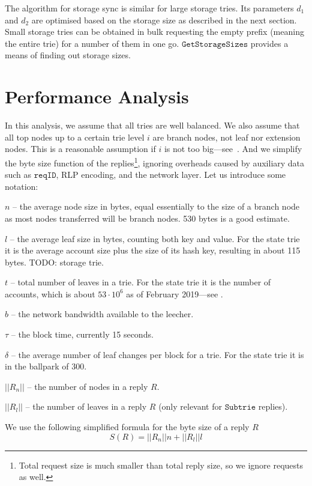 \documentclass{amsart}
\begin{document}
The algorithm for storage sync is similar for large storage tries.
Its parameters $d_1$ and $d_2$ are optimised based on the storage size as described in the next section.
Small storage tries can be obtained in bulk requesting the empty prefix (meaning the entire trie) for a number of them in one go.
$\texttt{GetStorageSizes}$ provides a means of finding out storage sizes.

\section{Performance Analysis}

In this analysis, we assume that all tries are well balanced.
We also assume that all top nodes up to a certain trie level $i$ are branch nodes, not leaf nor extension nodes.
This is a reasonable assumption if $i$ is not too big---see~\cite{akhunov_1x_workshop_part2}.
And we simplify the byte size function of the replies\footnote{Total
request size is much smaller than total reply size, so we ignore requests as well.},
ignoring overheads caused by auxiliary data such as $\texttt{reqID}$,
RLP encoding, and the network layer.
Let us introduce some notation:

$n$ -- the average node size in bytes,
equal essentially to the size of a branch node as most nodes transferred will be branch nodes.
530 bytes is a good estimate.

$l$ -- the average leaf size in bytes, counting both key and value.
For the state trie it is the average account size plus the size of its hash key,
resulting in about 115 bytes.
TODO: storage trie.

$t$ -- total number of leaves in a trie.
For the state trie it is the number of accounts,
which is about $53 \cdot 10^6$ as of February 2019---see \cite{akhunov_1x_workshop_part2}.

$b$ -- the network bandwidth available to the leecher.

$\tau$ -- the block time, currently 15 seconds.

$\delta$ -- the average number of leaf changes per block for a trie.
For the state trie it is in the ballpark of 300.

$||R_n||$ -- the number of nodes in a reply $R$.

$||R_l||$ -- the number of leaves in a reply $R$ (only relevant for $\texttt{Subtrie}$ replies).

We use the following simplified formula for the byte size of a reply $R$
\begin{equation}
    S(R) = ||R_n|| n + ||R_l|| l
\end{equation}
\end{document}

